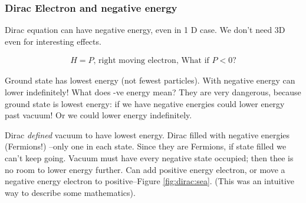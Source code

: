 \documentclass[]{article}
\begin{document}
\subsubsection{Dirac Electron  and negative energy}
Dirac equation can have negative energy, even in 1 D case. We don't need 3D even for interesting effects.

\begin{align*}
	H=P \text{, right moving electron, What if $P<0$?}
\end{align*} 

Ground state has lowest energy (not fewest particles). With negative energy can lower indefinitely! What does -ve energy mean? They are very dangerous, because ground state is lowest energy: if we have negative energies could lower energy past vacuum! Or we could lower energy indefinitely. 

Dirac \emph{defined} vacuum to have lowest energy. Dirac filled with negative energies (Fermions!) --only one in each state. Since they are Fermions, if state filled we can't keep going. Vacuum must have every negative state occupied; then thee is no room to lower energy further. Can add positive energy electron, or move a negative energy electron to positive--Figure \ref{fig:dirac:sea}. (This was an intuitive way to describe some mathematics).
\end{document}

